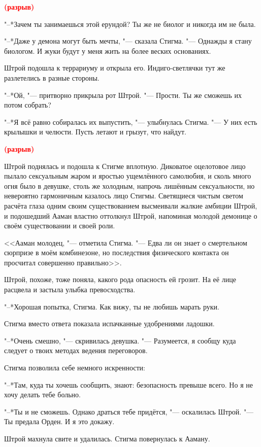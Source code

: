 \documentclass[a4paper,10pt]{book}
\newcommand{\mulang}[3]{#2}%
\newcommand{\spacing}{\textcolor{red}{\textbf{(разрыв)}}}
\begin{document}
\spacing

"--*Зачем ты занимаешься этой ерундой? Ты же не биолог и никогда им не была.

"--*Даже у демона могут быть мечты, "--- сказала Стигма. "--- Однажды я стану 
биологом. И жуки будут у меня жить на более веских основаниях.

Штрой подошла к террариуму и открыла его. Индиго-светлячки тут же разлетелись в 
разные стороны.

"--*Ой, "--- притворно прикрыла рот Штрой. "--- Прости. Ты же сможешь их потом 
собрать?

"--*Я всё равно собиралась их выпустить, "--- улыбнулась Стигма. "--- У них 
есть крылышки и челюсти. Пусть летают и грызут, что найдут.

\spacing

Штрой поднялась и подошла к Стигме вплотную. Диковатое оцелотовое лицо пылало сексуальным жаром и яростью ущемлённого самолюбия, и сколь много огня было в девушке, столь же холодным, напрочь лишённым сексуальности, но невероятно гармоничным казалось лицо Стигмы. Светящиеся чистым светом расчёта глаза одним своим существованием высмеивали жалкие амбиции Штрой, и подошедший Ааман властно оттолкнул Штрой, напоминая молодой демонице о своём существовании и своей роли.

<<Ааман молодец, "--- отметила Стигма. "--- Едва ли он знает о смертельном сюрпризе в моём комбинезоне, но последствия физического контакта он просчитал совершенно правильно>>.

Штрой, похоже, тоже поняла, какого рода опасность ей грозит. На её лице расцвела и застыла улыбка превосходства.

\mulang{}{"--*Хорошая попытка, Стигма.}
{``Nice try, Stijma.}
\mulang{}{Как вижу, ты не любишь марать руки.}
{You don't like to get your hands dirty, I guess.''}

Стигма вместо ответа показала испачканные удобрениями ладошки.

"--*Очень смешно, "--- скривилась девушка. "--- Разумеется, я сообщу куда следует о твоих методах ведения переговоров.

Стигма позволила себе немного искренности:

"--*Там, куда ты хочешь сообщить, знают: безопасность превыше всего. Но я не хочу делать тебе больно.

"--*Ты и не сможешь. Однако драться тебе придётся, "--- оскалилась Штрой. "--- 
Ты предала Орден. И я это докажу.

Штрой махнула свите и удалилась. Стигма повернулась к Ааману.
\end{document}

